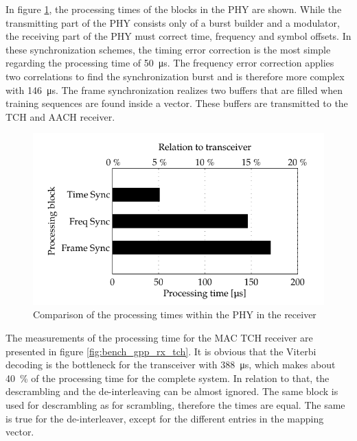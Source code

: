 In figure \ref{fig:bench_gpp_rx_phy}, the processing times of the blocks in the PHY are shown. While the transmitting part of the PHY consists only of a burst builder and a modulator, the receiving part of the PHY must correct time, frequency and symbol offsets. In these synchronization schemes, the timing error correction is the most simple regarding the processing time of \SI{50}{\micro s}. The frequency error correction applies two correlations to find the synchronization burst and is therefore more complex with \SI{146}{\micro s}. The frame synchronization realizes two buffers that are filled when training sequences are found inside a vector. These buffers are transmitted to the TCH and AACH receiver.
 
\begin{figure}[htb]
	\centering
		\includegraphics{../kapitel05/figures/bench_gpp_rx_phy.pdf}
	\caption{Comparison of the processing times within the PHY in the receiver}
	\label{fig:bench_gpp_rx_phy}
\end{figure}


The measurements of the processing time for the MAC TCH receiver are presented in figure \ref{fig:bench_gpp_rx_tch}. It is obvious that the Viterbi decoding is the bottleneck for the transceiver with \SI{388}{\micro s}, which makes about \SI{40}{\%} of the processing time for the complete system. In relation to that, the descrambling and the de-interleaving can be almost ignored. The same block is used for descrambling as for scrambling, therefore the times are equal. The same is true for the de-interleaver, except for the different entries in the mapping vector.

